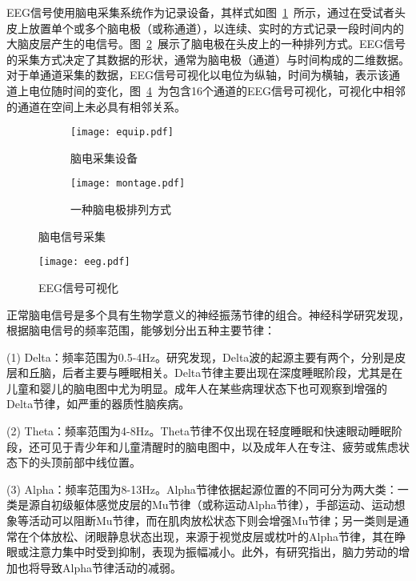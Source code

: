 EEG信号使用脑电采集系统作为记录设备，其样式如图~\ref{fig:equip}~所示，通过在受试者头皮上放置单个或多个脑电极（或称通道），以连续、实时的方式记录一段时间内的大脑皮层产生的电信号。图~\ref{fig:montage}~展示了脑电极在头皮上的一种排列方式。EEG信号的采集方式决定了其数据的形状，通常为脑电极（通道）与时间构成的二维数据。对于单通道采集的数据，EEG信号可视化以电位为纵轴，时间为横轴，表示该通道上电位随时间的变化，图~\ref{fig:eeg}~为包含16个通道的EEG信号可视化，可视化中相邻的通道在空间上未必具有相邻关系。
\begin{figure}[ht]
    \centering
    \begin{subfigure}{0.3\textwidth}
      \texttt{[image: equip.pdf]}
      \caption{脑电采集设备\cite{equip}}
      \label{fig:equip}
    \end{subfigure}\qquad
    \begin{subfigure}{0.3\textwidth}
      \texttt{[image: montage.pdf]}
      \caption{一种脑电极排列方式\cite{han2023eeg}}
      \label{fig:montage}
    \end{subfigure}
    \caption{脑电信号采集}
    \label{fig:eeg-cap}
  \end{figure}
\begin{figure}
    \centering
    \texttt{[image: eeg.pdf]}
    \caption{EEG信号可视化}
    \label{fig:eeg}
\end{figure}

正常脑电信号是多个具有生物学意义的神经振荡节律的组合\cite{1022779250.nh}。神经科学研究发现，根据脑电信号的频率范围，能够划分出五种主要节律：

(1) Delta：频率范围为0.5-4Hz。研究发现，Delta波的起源主要有两个，分别是皮层和丘脑，后者主要与睡眠相关\cite{kropotov2010quantitative}。Delta节律主要出现在深度睡眠阶段，尤其是在儿童和婴儿的脑电图中尤为明显。成年人在某些病理状态下也可观察到增强的Delta节律，如严重的器质性脑疾病。

(2) Theta：频率范围为4-8Hz。Theta节律不仅出现在轻度睡眠和快速眼动睡眠阶段，还可见于青少年和儿童清醒时的脑电图中，以及成年人在专注、疲劳或焦虑状态下的头顶前部中线位置\cite{ishihara1966activation,ishihara1967interaction}。

(3) Alpha：频率范围为8-13Hz。Alpha节律依据起源位置的不同可分为两大类：一类是源自初级躯体感觉皮层的Mu节律（或称运动Alpha节律）\cite{hari1997human}，手部运动、运动想象等活动可以阻断Mu节律，而在肌肉放松状态下则会增强Mu节律；另一类则是通常在个体放松、闭眼静息状态出现，来源于视觉皮层或枕叶的Alpha节律，其在睁眼或注意力集中时受到抑制，表现为振幅减小。此外，有研究指出，脑力劳动的增加也将导致Alpha节律活动的减弱\cite{1022779250.nh}。

